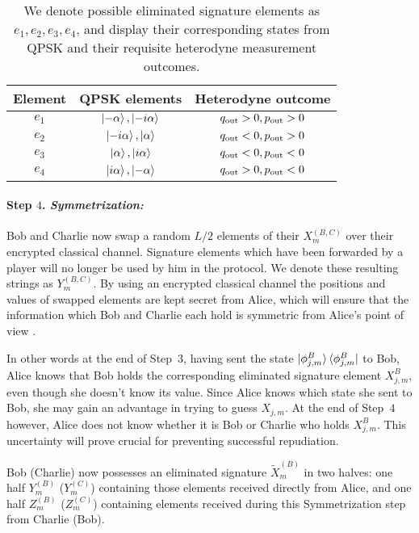 \begin{table*}
\captionsetup{width=0.8\linewidth}
\begin{tabular}{|c|c|c|}
\hline 
Element & QPSK elements & Heterodyne outcome \\ 
\hline 
$e_1$ & $\ket{- \alpha}, \ket{- i \alpha}$ & $q_{\text{out}} >0, p_{\text{out}} >0$ \\ 

$e_2$ & $\ket{- i \alpha}, \ket{\alpha}$ & $q_{\text{out}} < 0, p_{\text{out}} > 0$ \\ 

$e_3$ & $\ket{\alpha}, \ket{i \alpha}$ & $q_{\text{out}} < 0, p_{\text{out}} < 0 $ \\ 

$e_4$ & $\ket{i \alpha}, \ket{- \alpha}$ & $q_{\text{out}} > 0, p_{\text{out}} < 0$ \\ 
\hline

\end{tabular} 
\caption{\label{tab:elimsig} We denote possible eliminated signature elements as $e_1, e_2, e_3, e_4$, and display their corresponding states from QPSK and their requisite heterodyne measurement outcomes.}
\end{table*}


\paragraph{Step $4$. \emph{Symmetrization:}}
Bob and Charlie now swap a random $L/2$ elements of their $X_m^{\left(B, C\right)}$ over their encrypted classical channel. Signature elements which have been forwarded by a player will no longer be used by him in the protocol. We denote these resulting strings as $Y_m^{\left(B, C\right)}$. By using an encrypted classical channel the positions and values of swapped elements are kept secret from Alice, which will ensure that the information which Bob and Charlie each hold is symmetric from Alice's point of view \cite{Dunjko2014, Wallden2015}. 

In other words at the end of Step~$3$, having sent the state $\ket{\phi_{j, m}^B}\bra{\phi_{j, m}^B}$ to Bob, Alice knows that Bob holds the corresponding eliminated signature element $X_{j, m}^B$, even though she doesn't know its value. Since Alice knows which state she sent to Bob, she may gain an advantage in trying to guess $X_{j, m}$. At the end of Step~$4$ however, Alice does not know whether it is Bob or Charlie who holds $X_{j, m}^B$. This uncertainty will prove crucial for preventing successful repudiation.

Bob (Charlie) now possesses an eliminated signature $\tilde{X}_m^{\left(B\right)}$ in two halves: one half $Y_m^{\left(B\right)}$ ($Y_m^{\left(C\right)}$) containing those elements received directly from Alice, and one half $Z_m^{\left(B\right)}$ ($Z_m^{\left(C\right)}$) containing elements received during this Symmetrization step from Charlie (Bob).

